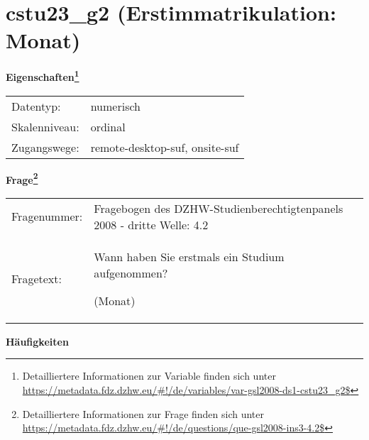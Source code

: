 
    \setcounter{footnote}{0}

    \vspace*{-1.8cm}
	\section{cstu23\_g2 (Erstimmatrikulation: Monat)}
	\label{section:cstu23_g2}



    \vspace*{0.5cm}
    \noindent\textbf{Eigenschaften\footnote{Detailliertere Informationen zur Variable finden sich unter
		\url{https://metadata.fdz.dzhw.eu/\#!/de/variables/var-gsl2008-ds1-cstu23_g2$}}}\\
	\begin{tabularx}{\hsize}{@{}lX}
	Datentyp: & numerisch \\
	Skalenniveau: & ordinal \\
	Zugangswege: &
	  remote-desktop-suf, 
	  onsite-suf
 \\
    \end{tabularx}



				\vspace*{0.5cm}
                \noindent\textbf{Frage\footnote{Detailliertere Informationen zur Frage finden sich unter
		              \url{https://metadata.fdz.dzhw.eu/\#!/de/questions/que-gsl2008-ins3-4.2$}}}\\
				\begin{tabularx}{\hsize}{@{}lX}
					Fragenummer: &
					  Fragebogen des DZHW-Studienberechtigtenpanels 2008 - dritte Welle:
					  4.2
 \\
					Fragetext: & Wann haben Sie erstmals ein Studium aufgenommen?\par  (Monat) \\
				\end{tabularx}





        		\vspace*{0.5cm}
                \noindent\textbf{Häufigkeiten}

